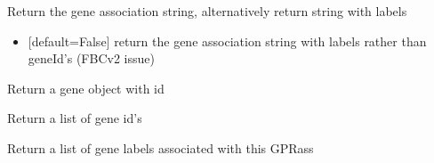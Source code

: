 \documentclass[letterpaper,10pt,english]{sphinxmanual}
\begin{document}
\begin{fulllineitems}
\begin{fulllineitems}
\label{\detokenize{modules_doc:cbmpy.CBModel.GeneProteinAssociation.getAssociationStr}}
\pysigstartsignatures
{}
\pysigstopsignatures
\sphinxAtStartPar
Return the gene association string, alternatively return string with labels
\begin{itemize}
\item {} 
\sphinxAtStartPar
{} {[}default=False{]} return the gene association string with labels rather than geneId’s (FBCv2 issue)

\end{itemize}

\end{fulllineitems}


\begin{fulllineitems}
\label{\detokenize{modules_doc:cbmpy.CBModel.GeneProteinAssociation.getGene}}
\pysigstartsignatures
{}
\pysigstopsignatures
\sphinxAtStartPar
Return a gene object with id

\end{fulllineitems}


\begin{fulllineitems}
\label{\detokenize{modules_doc:cbmpy.CBModel.GeneProteinAssociation.getGeneIds}}
\pysigstartsignatures
{}
\pysigstopsignatures
\sphinxAtStartPar
Return a list of gene id’s

\end{fulllineitems}


\begin{fulllineitems}
\label{\detokenize{modules_doc:cbmpy.CBModel.GeneProteinAssociation.getGeneLabels}}
\pysigstartsignatures
{}
\pysigstopsignatures
\sphinxAtStartPar
Return a list of gene labels associated with this GPRass


\end{fulllineitems}
\end{fulllineitems}
\end{document}

